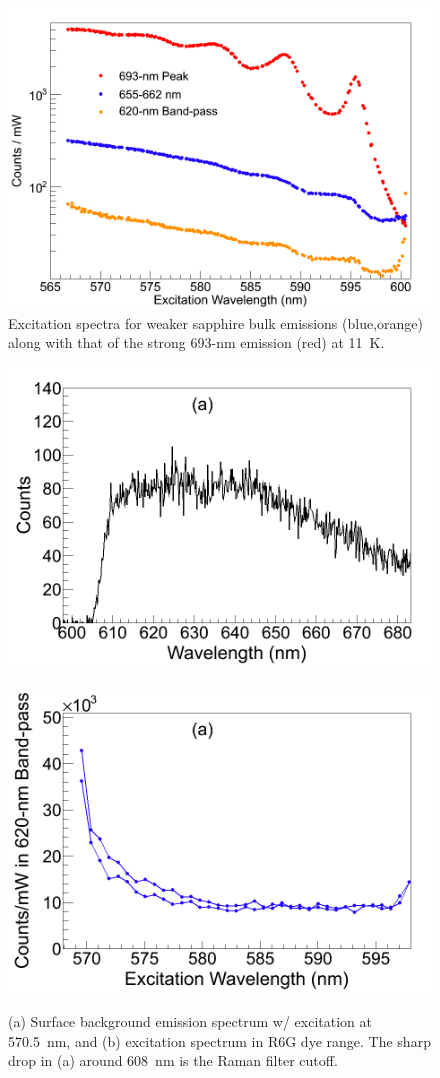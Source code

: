 \begin{figure} %
        \centering
                \includegraphics[width=.7\textwidth]{figures/Cr_broad.png}
                \caption{Excitation spectra for weaker sapphire bulk emissions (blue,orange) along with that of the strong 693-nm emission (red) at 11~K.}
        \label{fig:CrBroad}
\end{figure}

\begin{figure} %
        \centering
                \includegraphics[width=.5\textwidth]{figures/surfaceBG_a.png}
                ~
                \includegraphics[width=.5\textwidth]{figures/surfaceBG_b.png}
                \caption{(a) Surface background emission spectrum w/ excitation at 570.5~nm, and (b) excitation spectrum in R6G dye range.  The sharp drop in (a) around 608~nm is the Raman filter cutoff.}
\label{fig:surfBG}
\end{figure}

